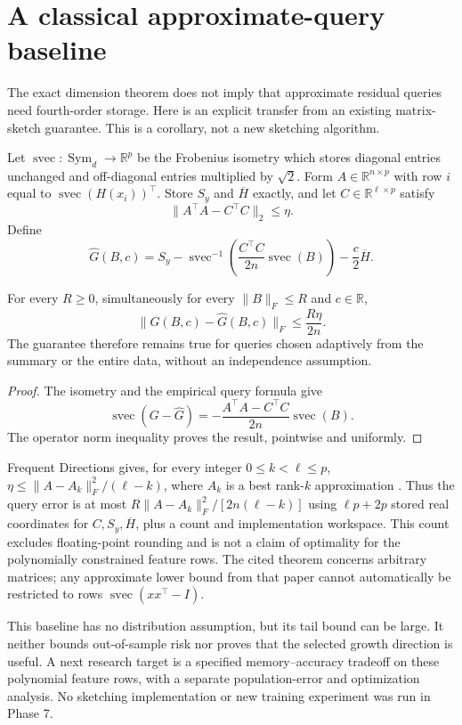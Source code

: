\section{A classical approximate-query baseline}
\label{sec:sketch-baseline}
The exact dimension theorem does not imply that approximate residual queries
need fourth-order storage. Here is an explicit transfer from an existing
matrix-sketch guarantee. This is a corollary, not a new sketching algorithm.

Let $\operatorname{svec}:\operatorname{Sym}_d\to\mathbb R^p$ be the
Frobenius isometry which stores diagonal entries unchanged and off-diagonal
entries multiplied by $\sqrt2$. Form $A\in\mathbb R^{n\times p}$ with
row $i$ equal to $\operatorname{svec}(H(x_i))^\top$. Store $S_y$ and
$\overline H$ exactly, and let $C\in\mathbb R^{\ell\times p}$ satisfy
\[
 \|A^\top A-C^\top C\|_2\le\eta.
\]
Define
\[
 \widehat G(B,c)=S_y-
 \operatorname{svec}^{-1}\!\left(\frac{C^\top C}{2n}
                       \operatorname{svec}(B)\right)
 -\frac c2\overline H.
\]
\begin{proposition}
\label{prop:sketch-transfer}
For every $R\ge0$, simultaneously for every $\|B\|_F\le R$ and
$c\in\mathbb R$,
\[
 \|G(B,c)-\widehat G(B,c)\|_F\le\frac{R\eta}{2n}.
\]
The guarantee therefore remains true for queries chosen adaptively from the
summary or the entire data, without an independence assumption.
\end{proposition}
\begin{proof}
The isometry and the empirical query formula give
\[
 \operatorname{svec}(G-\widehat G)
 =-\frac{A^\top A-C^\top C}{2n}\operatorname{svec}(B).
\]
The operator norm inequality proves the result, pointwise and uniformly.
\end{proof}

Frequent Directions gives, for every integer $0\le k<\ell\le p$,
$\eta\le\|A-A_k\|_F^2/(\ell-k)$, where $A_k$ is a best rank-$k$
approximation \cite[Theorem 1.1]{p7ghashami2015}. Thus the query error is
at most $R\|A-A_k\|_F^2/[2n(\ell-k)]$ using $\ell p+2p$ stored real
coordinates for $C,S_y,\overline H$, plus a count and implementation
workspace. This count excludes floating-point rounding and is not a
claim of optimality for the polynomially constrained feature rows.
The cited theorem concerns arbitrary matrices; any approximate lower
bound from that paper cannot automatically be restricted to rows
$\operatorname{svec}(xx^\top-I)$.

This baseline has no distribution assumption, but its tail bound can be
large. It neither bounds out-of-sample risk nor proves that the selected
growth direction is useful. A next research target is a specified
memory--accuracy tradeoff on these polynomial feature rows, with a
separate population-error and optimization analysis. No sketching
implementation or new training experiment was run in Phase 7.
